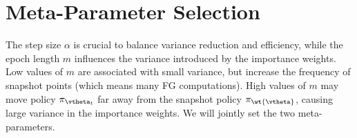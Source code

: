 \section{Meta-Parameter Selection}\label{sec:stopping}
\vspace{-0.05in}
The step size $\alpha$ is crucial to balance variance reduction and efficiency, while
the epoch length $m$ influences the variance introduced by the importance weights. Low values of $m$ are associated with small variance, but increase the frequency of snapshot points (which means many \acs{FG} computations). High values of $m$ may move policy $\pi_{\vtheta_t}$ far away from the snapshot policy $\pi_{\wt{\vtheta}}$, causing large variance in the importance weights. We will jointly set the two meta-parameters.

